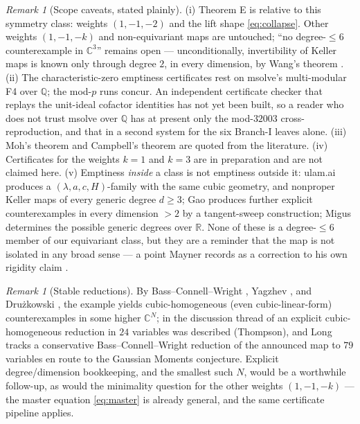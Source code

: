 \documentclass[11pt]{amsart}
\newcommand{\CC}{\mathbb{C}}
\newcommand{\QQ}{\mathbb{Q}}
\theoremstyle{plain}
\theoremstyle{definition}
\theoremstyle{remark}
\newtheorem{remark}[theorem]{Remark}
\begin{document}
\begin{remark}[Scope caveats, stated plainly]\label{rem:caveats}
(i) Theorem E is relative to this symmetry class: weights $(1,-1,-2)$ and
the lift shape \eqref{eq:collapse}. Other weights $(1,-1,-k)$ and
non-equivariant maps are untouched; ``no degree-$\le6$ counterexample in
$\CC^{3}$'' remains open --- unconditionally, invertibility of Keller
maps is known only through degree $2$, in every dimension, by Wang's
theorem \cite{Wang80}. (ii) The characteristic-zero emptiness
certificates rest on msolve's multi-modular F4 over $\QQ$; the mod-$p$
runs concur. An independent certificate checker that replays the
unit-ideal cofactor identities has not yet been built, so a reader who
does not trust msolve over $\QQ$ has at present only the mod-$32003$
cross-reproduction, and that in a second system for the six Branch-I
leaves alone. (iii) Moh's theorem and Campbell's theorem are quoted
from the literature. (iv) Certificates for the weights $k=1$ and $k=3$ are
in preparation and are not claimed here. (v) Emptiness \emph{inside} a
class is not emptiness outside it: ulam.ai \cite[Thm.~5.1,
Cor.~5.3]{Ulam26} produces a $(\lambda,a,c,H)$-family with the same cubic
geometry, and nonproper Keller maps of every generic degree $d\ge3$; Gao
\cite{Gao26} produces further explicit counterexamples in every dimension
$>2$ by a tangent-sweep construction; Migus \cite{Migus26} determines the
possible generic degrees over $\mathbb{R}$. None of these is a degree-$\le6$
member of our equivariant class, but they are a reminder that the map is
not isolated in any broad sense --- a point Mayner records as a correction
to his own rigidity claim \cite[\S12]{Mayner26}.
\end{remark}

\begin{remark}[Stable reductions]
By Bass--Connell--Wright \cite{BCW82}, Yagzhev \cite{Yagzhev80}, and
Dru\.zkowski \cite{Druzkowski83}, the example yields cubic-homogeneous
(even cubic-linear-form) counterexamples in some higher $\CC^{N}$; in the discussion thread of
\cite{Speyer26} an explicit cubic-homogeneous reduction in $24$ variables
was described (Thompson), and Long \cite{Long26} tracks a conservative
Bass--Connell--Wright reduction of the announced map to $79$ variables en
route to the Gaussian Moments conjecture. Explicit degree/dimension
bookkeeping, and the smallest such $N$, would be a worthwhile follow-up,
as would the minimality question for the other weights $(1,-1,-k)$ --- the
master equation \eqref{eq:master} is already general, and the same
certificate pipeline applies.
\end{remark}
\end{document}
